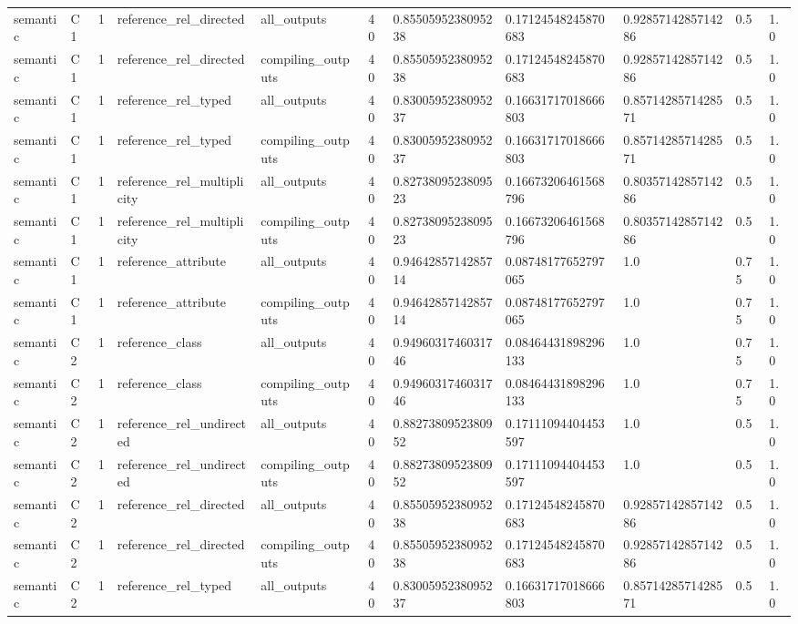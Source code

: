 \begin{tabular}{lllllllllll}
semantic & C1 & 1 & reference\_rel\_directed & all\_outputs & 40 & 0.8550595238095238 & 0.17124548245870683 & 0.9285714285714286 & 0.5 & 1.0 \\
semantic & C1 & 1 & reference\_rel\_directed & compiling\_outputs & 40 & 0.8550595238095238 & 0.17124548245870683 & 0.9285714285714286 & 0.5 & 1.0 \\
semantic & C1 & 1 & reference\_rel\_typed & all\_outputs & 40 & 0.8300595238095237 & 0.16631717018666803 & 0.8571428571428571 & 0.5 & 1.0 \\
semantic & C1 & 1 & reference\_rel\_typed & compiling\_outputs & 40 & 0.8300595238095237 & 0.16631717018666803 & 0.8571428571428571 & 0.5 & 1.0 \\
semantic & C1 & 1 & reference\_rel\_multiplicity & all\_outputs & 40 & 0.8273809523809523 & 0.16673206461568796 & 0.8035714285714286 & 0.5 & 1.0 \\
semantic & C1 & 1 & reference\_rel\_multiplicity & compiling\_outputs & 40 & 0.8273809523809523 & 0.16673206461568796 & 0.8035714285714286 & 0.5 & 1.0 \\
semantic & C1 & 1 & reference\_attribute & all\_outputs & 40 & 0.9464285714285714 & 0.08748177652797065 & 1.0 & 0.75 & 1.0 \\
semantic & C1 & 1 & reference\_attribute & compiling\_outputs & 40 & 0.9464285714285714 & 0.08748177652797065 & 1.0 & 0.75 & 1.0 \\
semantic & C2 & 1 & reference\_class & all\_outputs & 40 & 0.9496031746031746 & 0.08464431898296133 & 1.0 & 0.75 & 1.0 \\
semantic & C2 & 1 & reference\_class & compiling\_outputs & 40 & 0.9496031746031746 & 0.08464431898296133 & 1.0 & 0.75 & 1.0 \\
semantic & C2 & 1 & reference\_rel\_undirected & all\_outputs & 40 & 0.8827380952380952 & 0.17111094404453597 & 1.0 & 0.5 & 1.0 \\
semantic & C2 & 1 & reference\_rel\_undirected & compiling\_outputs & 40 & 0.8827380952380952 & 0.17111094404453597 & 1.0 & 0.5 & 1.0 \\
semantic & C2 & 1 & reference\_rel\_directed & all\_outputs & 40 & 0.8550595238095238 & 0.17124548245870683 & 0.9285714285714286 & 0.5 & 1.0 \\
semantic & C2 & 1 & reference\_rel\_directed & compiling\_outputs & 40 & 0.8550595238095238 & 0.17124548245870683 & 0.9285714285714286 & 0.5 & 1.0 \\
semantic & C2 & 1 & reference\_rel\_typed & all\_outputs & 40 & 0.8300595238095237 & 0.16631717018666803 & 0.8571428571428571 & 0.5 & 1.0 \\

\end{tabular}
